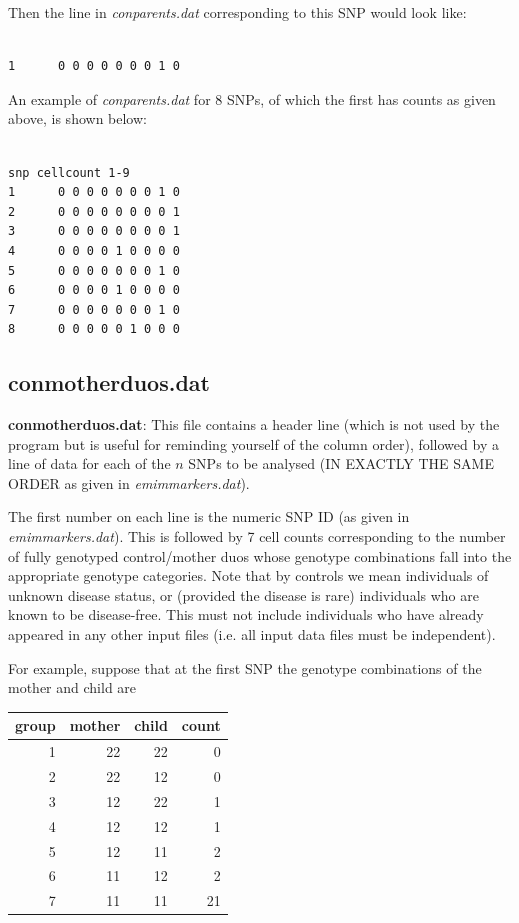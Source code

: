 \documentclass[a4paper,12pt]{article}
\begin{document}
Then the line in {\it conparents.dat} corresponding to this SNP would look like: 
\vspace{0.35cm} \begin{lstlisting}

1      0 0 0 0 0 0 0 1 0

\end{lstlisting} \vspace{0.35cm}
An example of {\it conparents.dat} for 8 SNPs, of which the first has counts as given above, is shown below: 
\vspace{0.35cm} \begin{lstlisting}

snp cellcount 1-9
1      0 0 0 0 0 0 0 1 0
2      0 0 0 0 0 0 0 0 1
3      0 0 0 0 0 0 0 0 1
4      0 0 0 0 1 0 0 0 0
5      0 0 0 0 0 0 0 1 0
6      0 0 0 0 1 0 0 0 0
7      0 0 0 0 0 0 0 1 0
8      0 0 0 0 0 1 0 0 0

\end{lstlisting} \vspace{0.35cm}

\subsection{conmotherduos.dat}
\label{conmotherduos}

{\bf conmotherduos.dat}: This file contains a header line (which is not used by the program but is useful for reminding yourself of the column order), followed by a line of data for each of the $n$ SNPs to be analysed (IN EXACTLY THE SAME ORDER as given in {\it emimmarkers.dat}). 

The first number on each line is the numeric SNP ID (as given in {\it emimmarkers.dat}). This is followed by 7 cell counts corresponding to the number of fully genotyped control/mother duos whose genotype combinations fall into the appropriate genotype categories. Note that by controls we mean individuals of unknown disease status, or (provided the disease is rare) individuals who are known to be disease-free. This must not include individuals who have already appeared in any other input files (i.e. all input data files must be independent). 

For example, suppose that at the first SNP the genotype combinations of the mother and child are 

{\begin{center}\begin{tabular}{rrrr}
group  & mother  & child  & count\\
\hline
1  & 22  & 22  & 0\\
2  & 22  & 12  & 0\\
3  & 12  & 22  & 1\\
4  & 12  & 12  & 1\\
5  & 12  & 11  & 2\\
6  & 11  & 12  & 2\\
7  & 11  & 11  & 21\\
\end{tabular}\end{center}}
\end{document}
